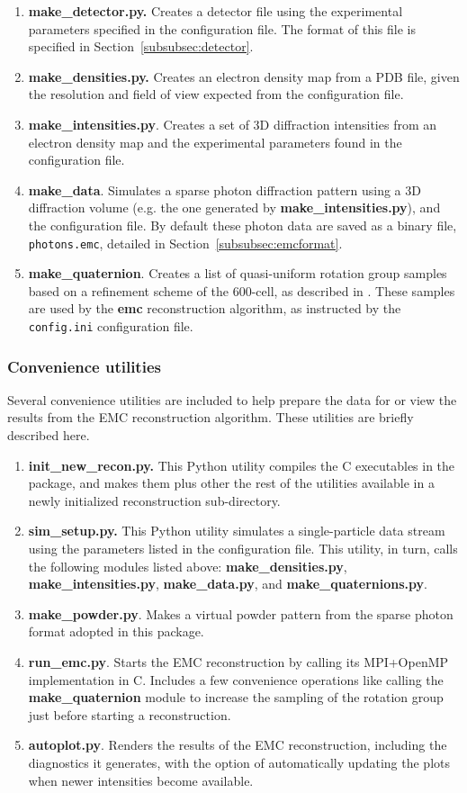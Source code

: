 \documentclass[]{iucr}              %
\begin{document}
\begin{enumerate}
\item{\bf make\_detector.py.} Creates a detector file using the experimental parameters specified in the configuration file. The format of this file is specified in Section~\ref{subsubsec:detector}.
\item{\bf make\_densities.py.} Creates an electron density map from a PDB file, given the resolution and field of view expected from the configuration file.
\item{\bf make\_intensities.py}. Creates a set of 3D diffraction intensities from an electron density map and the experimental parameters found in the configuration file.  
\item{\bf make\_data}. Simulates a sparse photon diffraction pattern using a 3D diffraction volume (e.g. the one generated by {\bf make\_intensities.py}), and the configuration file. By default these photon data are saved as a binary file, \texttt{photons.emc}, detailed in Section~\ref{subsubsec:emcformat}.
\item{\bf make\_quaternion}. Creates a list of quasi-uniform rotation group samples based on a refinement scheme of the 600-cell, as described in . These samples are used by the {\bf emc} reconstruction algorithm, as instructed by the \texttt{config.ini} configuration file.
\end{enumerate}

\subsubsection{Convenience utilities}\label{subsubsec:utils}
Several convenience utilities are included to help prepare the data for or view the results from the EMC reconstruction algorithm. These utilities are briefly described here. 
\begin{enumerate}
\item{\bf init\_new\_recon.py.} This Python utility compiles the C executables in the package, and makes them plus other the rest of the utilities available in a newly initialized reconstruction sub-directory.
\item{\bf sim\_setup.py.} This Python utility simulates a single-particle data stream using the parameters listed in the configuration file. This utility, in turn, calls the following modules listed above: {\bf make\_densities.py}, {\bf make\_intensities.py}, {\bf make\_data.py}, and {\bf make\_quaternions.py}.
\item{\bf make\_powder.py}. Makes a virtual powder pattern from the sparse photon format adopted in this package.
\item{\bf run\_emc.py}. Starts the EMC reconstruction by calling its MPI+OpenMP implementation in C. Includes a few convenience operations like calling the {\bf make\_quaternion} module to increase the sampling of the rotation group just before starting a reconstruction.
\item{\bf autoplot.py}. Renders the results of the EMC reconstruction, including the diagnostics it generates, with the option of automatically updating the plots when newer intensities become available.
\end{enumerate}
\end{document}
